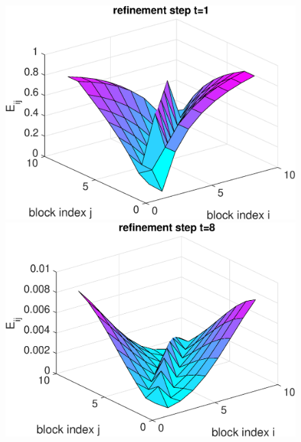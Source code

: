 \begin{example}
{%
%
\begin{figure}[h!]
\vspace{-1.1em}
\hspace{-1cm}
\centering
\hspace*{2em}
\begin{minipage}[t]{0.48\linewidth}
\centering
\includegraphics[width=0.99\linewidth]{figures/9times9_Z2_Error_t1.eps}
\end{minipage}
%
\begin{minipage}[t]{0.48\linewidth}
\includegraphics[width=0.99\linewidth]{figures/9times9_Z2_Error_t8.eps}

\end{minipage}
\end{figure}}
\end{example}

